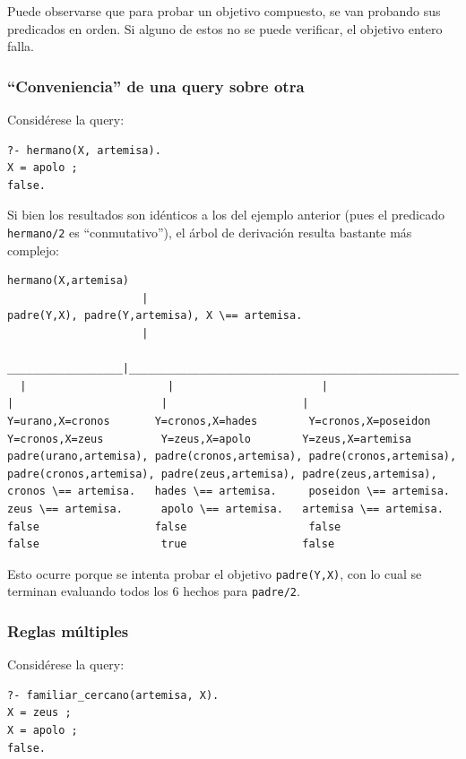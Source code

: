 \documentclass[12pt,titlepage]{article}
\begin{document}
Puede observarse que para probar un objetivo compuesto, se van probando sus predicados en orden. Si alguno de estos no se puede verificar, el objetivo entero falla.

\subsubsection{``Conveniencia'' de una query sobre otra}

Considérese la query:
\begin{lstlisting}
?- hermano(X, artemisa).
X = apolo ;
false.
\end{lstlisting}

Si bien los resultados son idénticos a los del ejemplo anterior (pues el predicado \lstinline|hermano/2| es ``conmutativo''), el árbol de derivación resulta bastante más complejo:
\begin{Verbatim}[samepage=true,fontsize=\tiny]
            hermano(X,artemisa)
                     |
padre(Y,X), padre(Y,artemisa), X \== artemisa.
                     |
   __________________|_________________________________________________________________________________________________
  |                      |                       |                       |                       |                     |
Y=urano,X=cronos       Y=cronos,X=hades        Y=cronos,X=poseidon     Y=cronos,X=zeus         Y=zeus,X=apolo        Y=zeus,X=artemisa
padre(urano,artemisa), padre(cronos,artemisa), padre(cronos,artemisa), padre(cronos,artemisa), padre(zeus,artemisa), padre(zeus,artemisa),
cronos \== artemisa.   hades \== artemisa.     poseidon \== artemisa.  zeus \== artemisa.      apolo \== artemisa.   artemisa \== artemisa.
false                  false                   false                   false                   true                  false
\end{Verbatim}

Esto ocurre porque se intenta probar el objetivo \lstinline|padre(Y,X)|, con lo cual se terminan evaluando todos los 6 hechos para \lstinline|padre/2|.

\subsubsection{Reglas múltiples}

Considérese la query:
\begin{lstlisting}
?- familiar_cercano(artemisa, X).
X = zeus ;
X = apolo ;
false.
\end{lstlisting}
\end{document}
